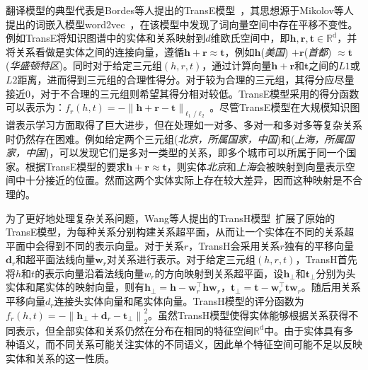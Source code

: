 \documentclass[algorithmlist, AutoFakeBold, AutoFakeSlant, figurelist, tablelist, nomlist, engineering]{seuthesix}
\begin{document}
翻译模型的典型代表是Bordes等人提出的TransE模型~\cite{bordes2013translating}，其思想源于Mikolov等人提出的词嵌入模型word2vec~\cite{toms2013}，在该模型中发现了词向量空间中存在平移不变性。例如TransE将知识图谱中的实体和关系映射到$d$维欧氏空间中，即$\bm{h}, \bm{r}, \bm{t} \in \mathbb{R}^{\mathrm{d}}$，并将关系看做是实体之间的连接向量，遵循$\bm{h} + \bm{r} \approx \bm{t}$，例如$\bm{h}$(\textit{美国}) $+ \bm{r}$(\textit{首都}) $\approx \bm{t}$(\textit{华盛顿特区})。同时对于给定三元组$(h, r, t)$，通过计算向量$\bm{h} + \bm{r}$和$\bm{t}$之间的$L1$或$L2$距离，进而得到三元组的合理性得分。对于较为合理的三元组，其得分应尽量接近0，对于不合理的三元组则希望其得分相对较低。TransE模型采用的得分函数可以表示为：$f_r(h, t) = - \|\bm{h} + \bm{r} - \bm{t}\|_{\ell_1 / \ell_2}$。尽管TransE模型在大规模知识图谱表示学习方面取得了巨大进步，但在处理如一对多、多对一和多对多等复杂关系时仍然存在困难。例如给定两个三元组(\textit{北京，所属国家，中国})和(\textit{上海，所属国家，中国})，可以发现它们是多对一类型的关系，即多个城市可以所属于同一个国家。根据TransE模型的要求$\bm{h} + \bm{r} \approx \bm{t}$，则实体\textit{北京}和\textit{上海}会被映射到向量表示空间中十分接近的位置。然而这两个实体实际上存在较大差异，因而这种映射是不合理的。

为了更好地处理复杂关系问题，Wang等人提出的TransH模型~\cite{wang2014knowledge}扩展了原始的TransE模型，为每种关系分别构建关系超平面，从而让一个实体在不同的关系超平面中会得到不同的表示向量。对于关系$r$，TransH会采用关系$r$独有的平移向量$\bm{d}_r$和超平面法线向量$\bm{w}_r$对关系进行表示。对于给定三元组$(h, r, t)$，TransH首先将$h$和$t$的表示向量沿着法线向量$w_r$的方向映射到关系超平面，设$\bm{h}_\perp$和$\bm{t}_\perp$分别为头实体和尾实体的映射向量，则有$\bm{h}_{\perp} = \bm{h} - \bm{w}_r^{\top} \bm{h} \bm{w}_r$，$\bm{t}_{\perp} = \bm{t} - \bm{w}_r^{\top} \bm{t} \bm{w}_r$。随后用关系平移向量$d_r$连接头实体向量和尾实体向量。TransH模型的评分函数为$f_r(h, t) = -\left\|\bm{h}_{\perp} + \bm{d}_r - \bm{t}_{\perp}\right\|_2^2$。虽然TransH模型使得实体能够根据关系获得不同表示，但全部实体和关系仍然在分布在相同的特征空间$\mathbb{R}^{\mathrm{d}}$中。由于实体具有多种语义，而不同关系可能关注实体的不同语义，因此单个特征空间可能不足以反映实体和关系的这一性质。
\end{document}
